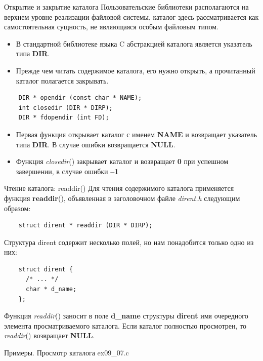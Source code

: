 \documentclass[xcolor=table]{beamer}
\begin{document}
\begin{frame}[fragile]{Открытие и закрытие каталога}
	Пользовательские библиотеки располагаются на верхнем уровне реализации файловой системы, каталог здесь рассматривается как самостоятельная сущность, не являющаяся особым файловым типом. 
	\begin{itemize}
		\item В стандартной библиотеке языка C абстракцией каталога является указатель типа \textbf{DIR}. 
		\item Прежде чем читать содержимое каталога, его нужно открыть, а прочитанный каталог полагается закрывать.
	\end{itemize}
	\begin{verbatim}
	DIR * opendir (const char * NAME);
	int closedir (DIR * DIRP);
	DIR * fdopendir (int FD);
	\end{verbatim}
	\begin{itemize}
		\item Первая функция открывает каталог с именем \textbf{NAME} и возвращает указатель типа \textbf{DIR}. В случае ошибки возвращается \textbf{NULL}. 
		\item Функция \textit{closedir}() закрывает каталог и возвращает \textbf{0} при успешном завершении, в случае ошибки \textbf{–1}
\end{itemize}
\end{frame}

\begin{frame}[fragile]{Чтение каталога: readdir()}
	Для чтения содержимого каталога применяется функция \textbf{readdir}(), объявленная в заголовочном файле \textit{dirent.h} следующим образом:
	\begin{verbatim}
	struct dirent * readdir (DIR * DIRP);
	\end{verbatim}
	Структура dirent содержит несколько полей, но нам понадобится только одно из них:
	\begin{verbatim}
	struct dirent {
	  /* ... */
	  char * d_name;
	};
	\end{verbatim}
	Функция \textit{readdir}() заносит в поле \textbf{d\_name} структуры \textbf{dirent} имя очередного элемента просматриваемого каталога. Если каталог полностью просмотрен, то \textit{readdir}() возвращает \textbf{NULL}.
	\begin{block}{Примеры. Просмотр каталога}
		ex09\_07.c
	\end{block}
\end{frame}
\end{document}
